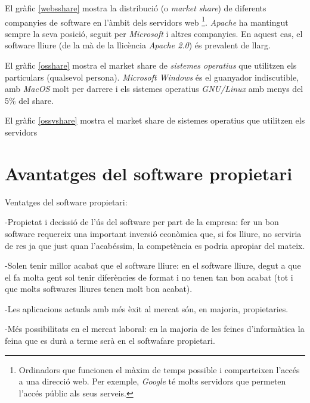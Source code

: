 	El gràfic \ref{websshare} mostra la distribució (o \emph{market share}) de diferents companyies de software
	en l'àmbit dels servidors web
	\footnote{Ordinadors que funcionen el màxim de temps possible i comparteixen l'accés a una direcció web.
	Per exemple, \emph{Google} té molts servidors que permeten l'accés públic als seus serveis.}.
	\emph{Apache}\cite{apache} ha mantingut sempre la seva posició,
	seguit per \emph{Microsoft} i altres companyies. En aquest cas, el software lliure (de la mà de la
	llicència \emph{Apache 2.0}\cite{apachelicense}) és prevalent de llarg.

	El gràfic \ref{osshare} mostra el market share de \emph{sistemes operatius} que utilitzen els particulars
	(qualsevol persona). \emph{Microsoft Windows} és el guanyador indiscutible, amb \emph{MacOS} molt per darrere
	i els sistemes operatius \emph{GNU/Linux} amb menys del 5\% del share.

	El gràfic \ref{ossvshare} mostra el market share de sistemes operatius que utilitzen els servidors


\section{Avantatges del software propietari}

Ventatges del software propietari: 

-Propietat i decissió de l'ús del software per part de la empresa: fer un bon software 
requereix una important inversió econòmica que, si fos lliure, no serviria de res ja 
que just quan l'acabéssim, la competència es podria apropiar del mateix.

-Solen tenir millor acabat que el software lliure: en el software lliure, degut a que
 el fa molta gent sol tenir diferències de format i no tenen tan bon acabat (tot i que
 molts softwares lliures tenen molt bon acabat).

-Les aplicacions actuals amb més èxit al mercat són, en majoria, propietaries.

-Més possibilitats en el mercat laboral: en la majoria de les feines d'informàtica la
feina que es durà a terme serà en el softwafare propietari.
\cite{gentegeek}








